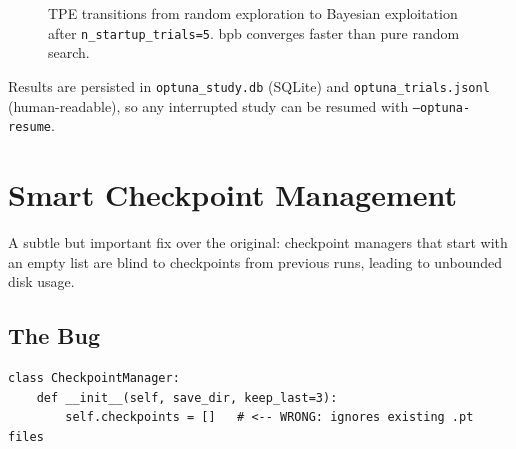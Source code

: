\documentclass[12pt, a4paper]{article}
\newcommand{\file}[1]{\texttt{#1}}
\newcommand{\flag}[1]{\texttt{--#1}}
\begin{document}
\begin{figure}[H]
\centering
{}
\caption{TPE transitions from random exploration to Bayesian exploitation after
\texttt{n\_startup\_trials=5}. bpb converges faster than pure random search.}
\label{fig:optuna}
\end{figure}

Results are persisted in \file{optuna\_study.db} (SQLite) and \file{optuna\_trials.jsonl}
(human-readable), so any interrupted study can be resumed with \flag{optuna-resume}.

\section{Smart Checkpoint Management}

A subtle but important fix over the original: checkpoint managers that start with an
empty list are blind to checkpoints from previous runs, leading to unbounded disk usage.

\subsection{The Bug}

\begin{tcolorbox}[callout=accent, title=Before: silent disk accumulation]
\begin{lstlisting}[style=pythonstyle]
class CheckpointManager:
    def __init__(self, save_dir, keep_last=3):
        self.checkpoints = []   # <-- WRONG: ignores existing .pt files
\end{lstlisting}
\end{tcolorbox}
\end{document}
